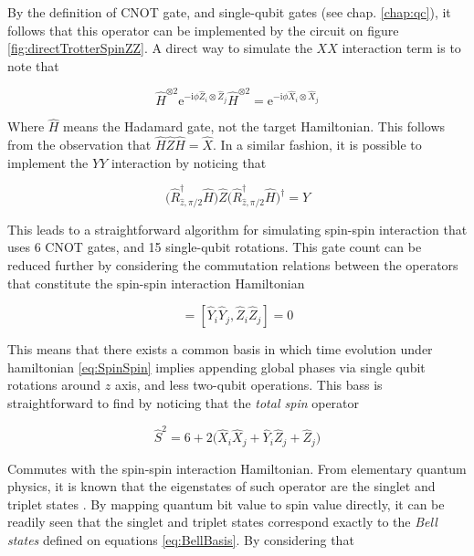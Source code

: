   By the definition of CNOT gate, and single-qubit gates (see chap. \ref{chap:qc}), it follows that this operator can be implemented by the circuit on figure \ref{fig:directTrotterSpinZZ}. A direct way to simulate the $XX$ interaction term is to note that

  \begin{equation}
    \hat{H}^{\otimes 2} \mathrm{e}^{-\mathrm{i}\phi \hat{Z}_i \otimes \hat{Z}_j} \hat{H}^{\otimes 2} = \mathrm{e}^{-\mathrm{i}\phi \hat{X}_i \otimes \hat{X}_j}
  \end{equation}

  Where $\hat{H}$ means the Hadamard gate, not the target Hamiltonian. This follows from the observation that $\hat{H}\hat{Z}\hat{H} = \hat{X}$. In a similar fashion, it is possible to implement the $YY$ interaction by noticing that

  \begin{equation}
    \Big(\hat{R}_{\hat{z}, \pi/2}^{\dagger}\hat{H}\Big)\hat{Z}\Big(\hat{R}_{\hat{z}, \pi/2}^{\dagger}\hat{H}\Big)^{\dagger} = \hat{Y}
  \end{equation}

  

  This leads to a straightforward algorithm for simulating spin-spin interaction that uses 6 CNOT gates, and 15 single-qubit rotations. This gate count can be reduced further by considering the commutation relations between the operators that constitute the spin-spin interaction Hamiltonian

  \begin{equation}
    [\hat{X}_i\hat{X}_j, \hat{Z}_i\hat{Z}_j] = [\hat{Y}_i\hat{Y}_j, \hat{Z}_i\hat{Z}_j] = 0
    \label{eq:CommutationRelations}
  \end{equation}

  This means that there exists a common basis in which time evolution under hamiltonian \ref{eq:SpinSpin} implies appending global phases via single qubit rotations around $\hat{z}$ axis, and less two-qubit operations. This bass is straightforward to find by noticing that the \textit{total spin} operator

  \begin{equation}
    \hat{S}^2 = 6 + 2\Big(\hat{X}_i\hat{X}_j + \hat{Y}_i\hat{Z}_j + \hat{Z}_j\Big) 
    \label{eq:TotalSpin}
  \end{equation}

  Commutes with the spin-spin interaction Hamiltonian. From elementary quantum physics, it is known that the eigenstates of such operator are the singlet and triplet states \cite{Beck}. By mapping quantum bit value to spin value directly, it can be readily seen that the singlet and triplet states correspond exactly to the \textit{Bell states} defined on equations \ref{eq:BellBasis}. By considering that

